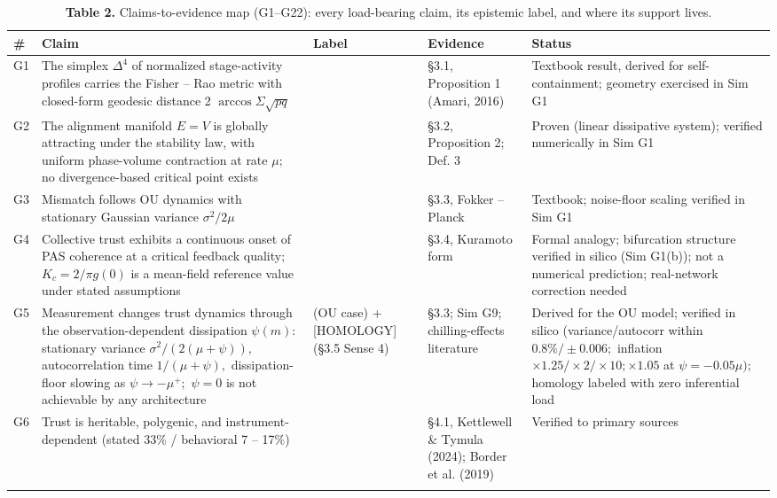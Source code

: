\documentclass[11pt,twocolumn]{article}
\theoremstyle{gttdef}
\theoremstyle{gttplain}
\begin{document}
\begin{table}[!tb]
\centering\footnotesize
\caption*{\textbf{Table 2.} Claims-to-evidence map (G1--G22): every load-bearing claim, its epistemic label, and where its support lives.}
\setlength{\tabcolsep}{4pt}
\begin{tabular}{@{}>{\raggedright\arraybackslash}p{}>{\raggedright\arraybackslash}p{}>{\raggedright\arraybackslash}p{}>{\raggedright\arraybackslash}p{}>{\raggedright\arraybackslash}p{}@{}}
\toprule
\textbf{\#} & \textbf{Claim} & \textbf{Label} & \textbf{Evidence} & \textbf{Status} \\
\midrule
G1 & The simplex $\Delta^{4}$ of normalized stage-activity profiles carries the Fisher -- Rao metric with closed-form geodesic distance 2 $\arccos \Sigma \sqrt{pq}$ & [STANDARD] & \S{}3.1, Proposition 1 (Amari, 2016) & Textbook result, derived for self-containment; geometry exercised in Sim G1 \\
\addlinespace[3pt]
G2 & The alignment manifold $E = V$ is globally attracting under the stability law, with uniform phase-volume contraction at rate $\mu;$ no divergence-based critical point exists & [STANDARD] & \S{}3.2, Proposition 2; Def. 3 & Proven (linear dissipative system); verified numerically in Sim G1 \\
\addlinespace[3pt]
G3 & Mismatch follows OU dynamics with stationary Gaussian variance $\sigma^{2}/2\mu$ & [STANDARD] & \S{}3.3, Fokker -- Planck & Textbook; noise-floor scaling verified in Sim G1 \\
\addlinespace[3pt]
G4 & Collective trust exhibits a continuous onset of PAS coherence at a critical feedback quality; $K_c = 2/\pi g(0)$ is a mean-field reference value under stated assumptions & [ANALOGY] & \S{}3.4, Kuramoto form & Formal analogy; bifurcation structure verified in silico (Sim G1(b)); not a numerical prediction; real-network correction needed \\
\addlinespace[3pt]
G5 & Measurement changes trust dynamics through the observation-dependent dissipation $\psi(m):$ stationary variance $\sigma^{2}/(2(\mu+\psi)),$ autocorrelation time $1/(\mu+\psi),$ dissipation-floor slowing as $\psi \to -\mu^{+};$ $\psi = 0$ is not achievable by any architecture & [DERIVED] (OU case) + [HOMOLOGY] (\S{}3.5 Sense 4) & \S{}3.3; Sim G9; chilling-effects literature & Derived for the OU model; verified in silico (variance/autocorr within $0.8\%/\pm0.006;$ inflation $\times1.25/\times2/\times10; \times1.05$ at $\psi = -0.05\mu);$ homology labeled with zero inferential load \\
\addlinespace[3pt]
G6 & Trust is heritable, polygenic, and instrument-dependent (stated 33\% / behavioral 7 -- 17\%) & [EMPIRICAL] & \S{}4.1, Kettlewell \& Tymula (2024); Border et al. (2019) & Verified to primary sources \\
\addlinespace[3pt]
\bottomrule
\end{tabular}
\end{table}
\end{document}
